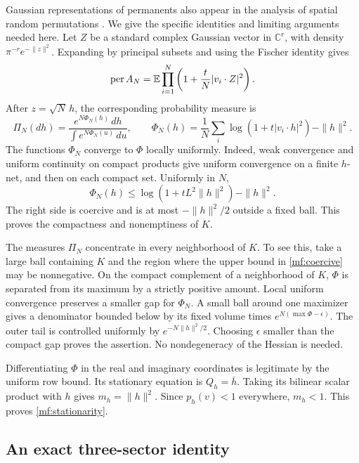 Gaussian representations of permanents also appear in the analysis of
spatial random permutations \cite{FyodorovMuirhead2021}.
We give the specific identities and limiting arguments needed here.
Let \(Z\) be a standard complex Gaussian vector in \(\mathbb C^r\), with
density \(\pi^{-r}e^{-\|z\|^2}\). Expanding by principal subsets and using
the Fischer identity gives
\begin{equation}\label{mf:gaussian}
 \operatorname{per} A_N=
 \mathbb E\prod_{i=1}^N\left(1+\frac tN|v_i\cdot Z|^2\right).
\end{equation}
After \(z=\sqrt N\,h\), the corresponding probability measure is
\begin{equation}\label{mf:tilted}
 \Pi_N(dh)=
 \frac{e^{N\Phi_N(h)}\,dh}{\int e^{N\Phi_N(u)}\,du},\qquad
 \Phi_N(h)=\frac1N\sum_i\log(1+t|v_i\cdot h|^2)-\|h\|^2.
\end{equation}
The functions \(\Phi_N\) converge to \(\Phi\) locally uniformly.
Indeed, weak convergence and uniform continuity on compact products give
uniform convergence on a finite \(h\)-net, and then on each compact set.
Uniformly in \(N\),
\begin{equation}\label{mf:coercive}
 \Phi_N(h)\le\log(1+tL^2\|h\|^2)-\|h\|^2.
\end{equation}
The right side is coercive and is at most \(-\|h\|^2/2\) outside a
fixed ball. This proves the compactness and nonemptiness of \(K\).

The measures \(\Pi_N\) concentrate in every neighborhood of \(K\).
To see this, take a large ball containing \(K\) and the region where
the upper bound in \eqref{mf:coercive} may be nonnegative.
On the compact complement of a neighborhood of \(K\), \(\Phi\) is
separated from its maximum by a strictly positive amount.
Local uniform convergence preserves a smaller gap for \(\Phi_N\).
A small ball around one maximizer gives a denominator bounded below by
its fixed volume times \(e^{N(\max\Phi-\epsilon)}\).
The outer tail is controlled uniformly by
\(e^{-N\|h\|^2/2}\). Choosing \(\epsilon\) smaller than the compact gap
proves the assertion. No nondegeneracy of the Hessian is needed.

Differentiating \(\Phi\) in the real and imaginary coordinates is
legitimate by the uniform row bound. Its stationary equation is
\(Q_h=\overline h\). Taking its bilinear scalar product with \(h\)
gives \(m_h=\|h\|^2\). Since \(p_h(v)<1\) everywhere, \(m_h<1\).
This proves \eqref{mf:stationarity}.

\subsection{An exact three-sector identity}

